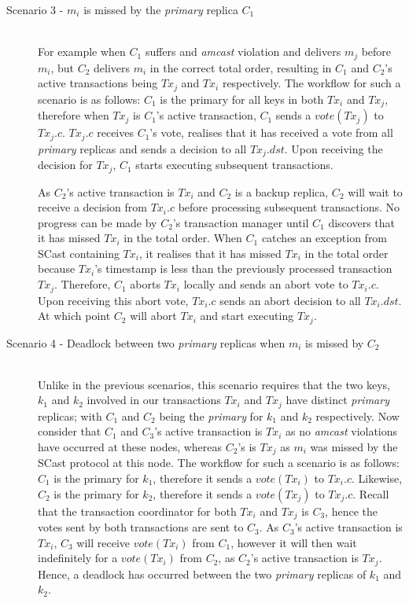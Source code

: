 \begin{description}
        
		\item[Scenario 3 - $m_i$ is missed by the \emph{primary} replica $C_1$] \hfill \\
        For example when $C_1$ suffers and \emph{amcast} violation and delivers $m_j$ before $m_i$, but $C_2$ delivers $m_i$ in the correct total order, resulting in $C_1$ and $C_2$'s active transactions being $Tx_j$ and $Tx_i$ respectively.  The workflow for such a scenario is as follows: $C_1$ is the primary for all keys in both $Tx_i$ and $Tx_j$, therefore when $Tx_j$ is $C_1$'s active transaction, $C_1$ sends a $vote(Tx_j)$ to $Tx_j.c$.  $Tx_j.c$ receives $C_1$'s vote, realises that it has received a vote from all \emph{primary} replicas and sends a decision to all $Tx_j.dst$.  Upon receiving the decision for $Tx_j$, $C_1$ starts executing subsequent transactions.  
        
        As $C_2$'s active transaction is $Tx_i$ and $C_2$ is a backup replica, $C_2$ will wait to receive a decision from $Tx_i.c$ before processing subsequent transactions.  No progress can be made by $C_2$'s transaction manager until $C_1$ discovers that it has missed $Tx_i$ in the total order.  When $C_1$ catches an exception from \textsf{SCast} containing $Tx_i$, it realises that it has missed $Tx_i$ in the total order because $Tx_i$'s timestamp is less than the previously processed transaction $Tx_j$.  Therefore, $C_1$ aborts $Tx_i$ locally and sends an abort vote to $Tx_i.c$.  Upon receiving this abort vote, $Tx_i.c$ sends an abort decision to all $Tx_i.dst$.  At which point $C_2$ will abort $Tx_i$ and start executing $Tx_j$.  
         
		\item[Scenario 4 - Deadlock between two \emph{primary} replicas when $m_i$ is missed by $C_2$] \hfill \\
		Unlike in the previous scenarios, this scenario requires that the two keys, $k_1$ and $k_2$ involved in our transactions $Tx_i$ and $Tx_j$ have distinct \emph{primary} replicas; with $C_1$ and $C_2$ being the \emph{primary} for $k_1$ and $k_2$ respectively.  Now consider that $C_1$ and $C_3$'s active transaction is $Tx_i$ as no \emph{amcast} violations have occurred at these nodes, whereas $C_2$'s is $Tx_j$ as $m_i$ was missed by the \textsf{SCast} protocol at this node.  The workflow for such a scenario is as follows: $C_1$ is the primary for $k_1$, therefore it sends a $vote(Tx_i)$ to $Tx_i.c$.  Likewise, $C_2$ is the primary for $k_2$, therefore it sends a $vote(Tx_j)$ to $Tx_j.c$.  Recall that the transaction coordinator for both $Tx_i$ and $Tx_j$ is $C_3$, hence the votes sent by both transactions are sent to $C_3$.  As $C_3$'s active transaction is $Tx_i$, $C_3$ will receive $vote(Tx_i)$ from $C_1$, however it will then wait indefinitely for a $vote(Tx_i)$ from $C_2$, as $C_2$'s active transaction is $Tx_j$.  Hence, a deadlock has occurred between the two \emph{primary} replicas of $k_1$ and $k_2$.  
		

\end{description}
